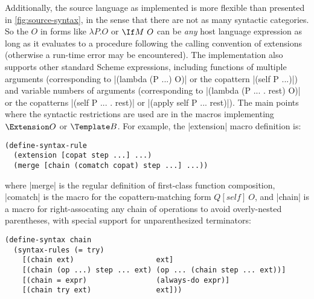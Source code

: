 Additionally, the source language as implemented is more flexible than presented in \cref{fig:source-syntax}, in the sense that there are not as many syntactic categories.  
So the $O$ in forms like $\lambda P. O$ or $\If M ~ O$ can be \emph{any} host language expression as long as it evaluates to a procedure following the calling convention of extensions (otherwise a run-time error may be encountered).
The implementation also supports other standard Scheme expressions, including functions of multiple arguments (corresponding to \scm|(lambda (P ...) O)| or the copattern \scm|(self P ...)|) and variable numbers of arguments (corresponding to \scm|(lambda (P ... . rest) O)| or the copatterns \scm|(self P ... . rest)| or \scm|(apply self P ... rest)|).
The main points where the syntactic restrictions are used are in the macros implementing $\Extension O$ or $\Template B$.
For example, the \scm|extension| macro definition is:
\begin{verbatim}
(define-syntax-rule
  (extension [copat step ...] ...)
  (merge [chain (comatch copat) step ...] ...))
\end{verbatim}
where \scm|merge| is the regular definition of first-class function composition, \scm|comatch| is the macro for the copattern-matching form $Q[self] ~ O$, and \scm|chain| is a macro for right-assocating any chain of operations to avoid overly-nested parentheses, with special support for unparenthesized terminators:
\begin{verbatim}
(define-syntax chain
  (syntax-rules (= try)
    [(chain ext)                   ext]
    [(chain (op ...) step ... ext) (op ... (chain step ... ext))]
    [(chain = expr)                (always-do expr)]
    [(chain try ext)               ext]))
\end{verbatim}

